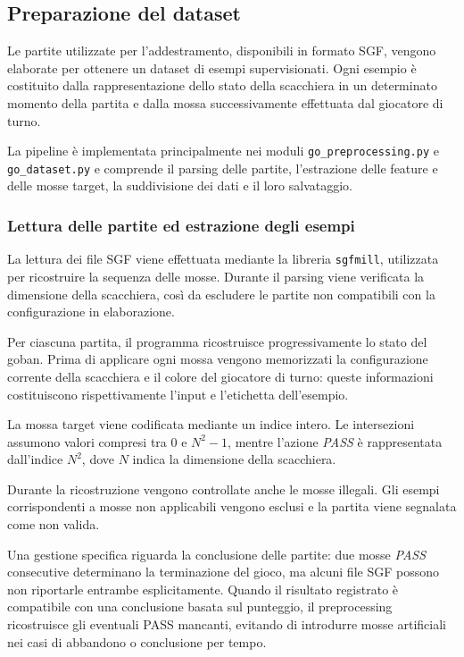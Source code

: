 \subsection{Preparazione del dataset}

Le partite utilizzate per l'addestramento, disponibili in formato SGF, vengono elaborate per ottenere un dataset di esempi supervisionati. Ogni esempio è costituito dalla rappresentazione dello stato della scacchiera in un determinato momento della partita e dalla mossa successivamente effettuata dal giocatore di turno.

La pipeline è implementata principalmente nei moduli \texttt{go\_preprocessing.py} e \texttt{go\_dataset.py} e comprende il parsing delle partite, l'estrazione delle feature e delle mosse target, la suddivisione dei dati e il loro salvataggio.

\subsubsection{Lettura delle partite ed estrazione degli esempi}

La lettura dei file SGF viene effettuata mediante la libreria \texttt{sgfmill}, utilizzata per ricostruire la sequenza delle mosse. Durante il parsing viene verificata la dimensione della scacchiera, così da escludere le partite non compatibili con la configurazione in elaborazione.

Per ciascuna partita, il programma ricostruisce progressivamente lo stato del goban. Prima di applicare ogni mossa vengono memorizzati la configurazione corrente della scacchiera e il colore del giocatore di turno: queste informazioni costituiscono rispettivamente l'input e l'etichetta dell'esempio.

La mossa target viene codificata mediante un indice intero. Le intersezioni assumono valori compresi tra \(0\) e \(N^2-1\), mentre l'azione \textit{PASS} è rappresentata dall'indice \(N^2\), dove \(N\) indica la dimensione della scacchiera.

Durante la ricostruzione vengono controllate anche le mosse illegali. Gli esempi corrispondenti a mosse non applicabili vengono esclusi e la partita viene segnalata come non valida.

Una gestione specifica riguarda la conclusione delle partite: due mosse \textit{PASS} consecutive determinano la terminazione del gioco, ma alcuni file SGF possono non riportarle entrambe esplicitamente. Quando il risultato registrato è compatibile con una conclusione basata sul punteggio, il preprocessing ricostruisce gli eventuali PASS mancanti, evitando di introdurre mosse artificiali nei casi di abbandono o conclusione per tempo.

